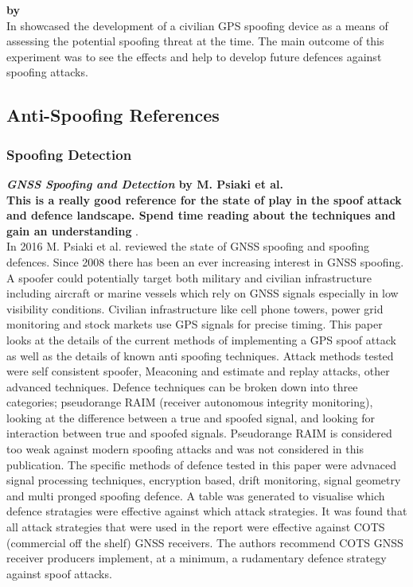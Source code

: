 \medskip

\textbf{\emph{} by \citeauthor{RN23}} \\
In \citeyear{RN23} \citeauthor{RN23} \cite{RN23} showcased the development of a civilian GPS spoofing device as a means of assessing the potential spoofing 
threat at the time. The main outcome of this experiment was to see the effects and help to develop future defences against spoofing attacks. 

\medskip
\subsection{Anti-Spoofing References}
\subsubsection{Spoofing Detection}

\textbf{\emph{GNSS Spoofing and Detection} by M. Psiaki et al.} \\
\textbf{This is a really good reference for the state of play in the spoof attack and defence landscape. Spend time reading about the techniques and 
gain an understanding} .\\
In 2016 M. Psiaki et al. \cite{RN12} reviewed the state of GNSS spoofing and spoofing defences. Since 2008 there has been an ever increasing 
interest in GNSS spoofing. A spoofer could potentially target both military and civilian infrastructure including aircraft or marine vessels which
rely on GNSS signals especially in low visibility conditions. Civilian infrastructure like cell phone towers, power grid monitoring and stock markets
use GPS signals for precise timing. This paper looks at the details of the current methods of implementing a GPS spoof attack as well as the details
of known anti spoofing techniques. Attack methods tested were self consistent spoofer, Meaconing and estimate and replay attacks, other advanced techniques.
Defence techniques can be broken down into three categories; pseudorange RAIM (receiver autonomous integrity monitoring),
looking at the difference between a true and spoofed signal, and looking for interaction between true and spoofed signals. Pseudorange RAIM is considered
too weak against modern spoofing attacks and was not considered in this publication. The specific methods of defence tested in this paper  
were advnaced signal processing techniques, encryption based, drift monitoring, signal geometry and multi pronged spoofing defence.
A table was generated to visualise which defence stratagies were effective against which attack strategies. 
It was found that all attack strategies that were used in the report were effective against COTS (commercial off the shelf) GNSS receivers. The authors
recommend COTS GNSS receiver producers implement, at a minimum, a rudamentary defence strategy against spoof attacks. 

